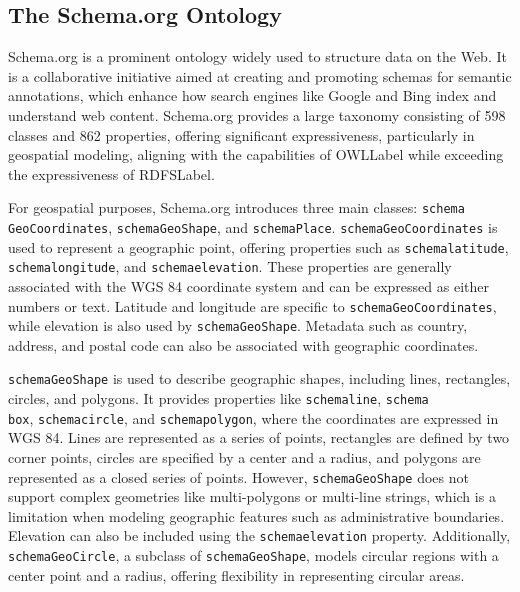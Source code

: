 \subsection{The Schema.org Ontology}\label{III-subsec:schemaOrg}

Schema.org is a prominent ontology widely used to structure data on the Web. It is a collaborative initiative aimed at creating and promoting schemas for semantic annotations, which enhance how search engines like Google and Bing index and understand web content. Schema.org provides a large taxonomy consisting of 598 classes and 862 properties, offering significant expressiveness, particularly in geospatial modeling, aligning with the capabilities of \acrshort{OWLLabel} while exceeding the expressiveness of \acrshort{RDFSLabel}.

For geospatial purposes, Schema.org introduces three main classes: \texttt{\gls{schema}\\GeoCoordinates}, \texttt{\gls{schema}GeoShape}, and \texttt{\gls{schema}Place}. \texttt{\gls{schema}GeoCoordinates} is used to represent a geographic point, offering properties such as \texttt{\gls{schema}latitude}, \texttt{\gls{schema}longitude}, and \texttt{\gls{schema}elevation}. These properties are generally associated with the WGS 84 coordinate system and can be expressed as either numbers or text. Latitude and longitude are specific to \texttt{\gls{schema}GeoCoordinates}, while elevation is also used by \texttt{\gls{schema}GeoShape}. Metadata such as country, address, and postal code can also be associated with geographic coordinates.

\texttt{\gls{schema}GeoShape} is used to describe geographic shapes, including lines, rectangles, circles, and polygons. It provides properties like \texttt{\gls{schema}line}, \texttt{\gls{schema}\\box}, \texttt{\gls{schema}circle}, and \texttt{\gls{schema}polygon}, where the coordinates are expressed in WGS 84. Lines are represented as a series of points, rectangles are defined by two corner points, circles are specified by a center and a radius, and polygons are represented as a closed series of points. However, \texttt{\gls{schema}GeoShape} does not support complex geometries like multi-polygons or multi-line strings, which is a limitation when modeling geographic features such as administrative boundaries. Elevation can also be included using the \texttt{\gls{schema}elevation} property. Additionally, \texttt{\gls{schema}GeoCircle}, a subclass of \texttt{\gls{schema}GeoShape}, models circular regions with a center point and a radius, offering flexibility in representing circular areas.

